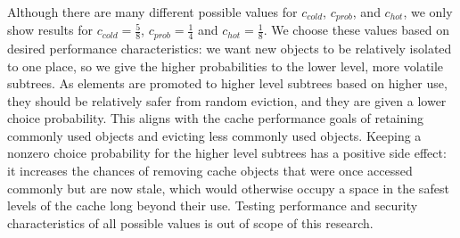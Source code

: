 \documentclass[letterpaper]{article}
\begin{document}
Although there are many different possible values for $c_{cold}$, $c_{prob}$, and $c_{hot}$,
we only show results for $c_{cold} = \frac{5}{8}$, $c_{prob} = \frac{1}{4}$ and $c_{hot} = \frac{1}{8}$.
We choose these values based on desired performance characteristics:
we want new objects to be relatively isolated to one place,
so we give the higher probabilities to the lower level, more volatile subtrees.
As elements are promoted to higher level subtrees based on higher use,
they should be relatively safer from random eviction, and they are given a lower choice probability.
This aligns with the cache performance goals of retaining commonly used objects
and evicting less commonly used objects.
Keeping a nonzero choice probability for the higher level subtrees has a positive side effect:
it increases the chances of removing cache objects that were once accessed commonly but are now stale,
which would otherwise occupy a space in the safest levels of the cache long beyond their use.
Testing performance and security characteristics of all possible values
is out of scope of this research.
\end{document}
